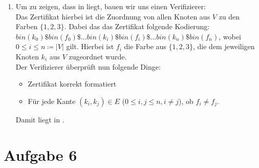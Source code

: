 \documentclass[a4paper,11pt]{scrartcl}
\begin{document}
\begin{enumerate}[label=\alph*)]
	\item	Um zu zeigen, dass  in \NP liegt, bauen wir uns einen Verifizierer:\\
		Das Zertifikat hierbei ist die Zuordnung von allen Knoten aus $V$ zu den Farben $\{1,2,3\}$. Dabei das das Zertifikat folgende Kodierung:\\
		$bin(k_0)\$bin(f_0)\$...bin(k_i)\$bin(f_i)\$...bin(k_n)\$bin(f_n)$, wobei $0\leq i \leq n \coloneqq \vert V \vert$ gilt. Hierbei ist $f_i$ die Farbe aus $\{1,2,3\}$, die dem jeweiligen Knoten $k_i$ aus $V$ zugeordnet wurde.\\
		Der Verifizierer überprüft nun folgende Dinge:
		\begin{itemize}
		\item Zertifikat korrekt formatiert
		\item Für jede Kante $(k_i,k_j) \in E$ ($0\leq i,j \leq n, i \neq j$), ob $f_i \neq f_j$.
		\end{itemize}
		Damit liegt  in \NP.
	\end{enumerate}
	
	
	\section*{Aufgabe 6}
	
	
\end{document}
